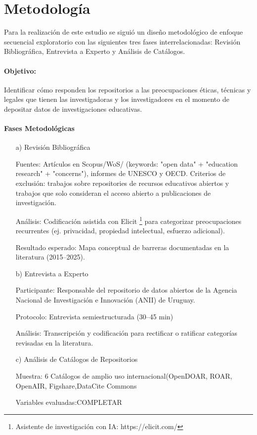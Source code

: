 \documentclass[runningheads]{llncs}
\begin{document}
\section{Metodología}
\label{Metodo}
Para la realización de este estudio se siguió un diseño metodológico de enfoque secuencial exploratorio con las siguientes tres fases interrelacionadas: Revisión Bibliográfica, Entrevista a Experto y Análisis de Catálogos.

\paragraph{Objetivo:} Identificar cómo responden los repositorios a las preocupaciones  éticas, técnicas y legales que tienen las investigadoras y los investigadores en el momento de depositar datos de investigaciones educativas.

\paragraph{Fases Metodológicas}
\begin{itemize}
    \item [a)] Revisión Bibliográfica
    
Fuentes: Artículos en Scopus/WoS/ (keywords: "open data" + "education research" + "concerns"), informes de UNESCO y OECD. Criterios de exclusión: trabajos sobre repositories de recursos educativos abiertos y trabajos que solo consideran el acceso abierto a publicaciones de investigación.

Análisis: Codificación asistida con Elicit \footnote{Asistente de investigación con IA: https://elicit.com/} para categorizar preocupaciones recurrentes (ej. privacidad, propiedad intelectual, esfuerzo adicional).

Resultado esperado: Mapa conceptual de barreras documentadas en la literatura (2015–2025).

\item [b)]  Entrevista a Experto

Participante: Responsable del repositorio de datos abiertos de la Agencia Nacional de Investigación e Innovación (ANII) de Uruguay.

Protocolo: Entrevista semiestructurada (30–45 min) 

Análisis: Transcripción y codificación para rectificar o ratificar categorías revisadas en la literatura.

\item [c)] Análisis de Catálogos de Repositorios

    Muestra:  6 Catálogos de amplio uso internacional(OpenDOAR, ROAR, OpenAIR, Figshare,DataCite Commons
    
    Variables evaluadas:COMPLETAR

\end{itemize}
\end{document}

